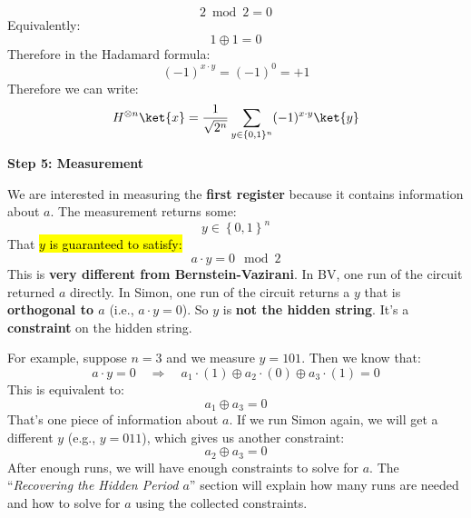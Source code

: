 \begin{remarkbox}[: Explain $H\ket{x} = \frac{1}{\sqrt{2}} \sum_{y\in\{0,1\}} (-1)^{xy}\ket{y}$]
\begin{equation*}
        2\bmod2=0
    \end{equation*}
    Equivalently:
    \begin{equation*}
        1\oplus1=0
    \end{equation*}
    Therefore in the Hadamard formula:
    \begin{equation*}
        (-1)^{x\cdot y}
        =
        (-1)^0
        =
        +1
    \end{equation*}
    Therefore we can write:
    \begin{equation*}
        H^{\otimes n}\ket{x} = \frac{1}{\sqrt{2^n}} \sum_{y \in \{0,1\}^n} (-1)^{x \cdot y} \ket{y}
    \end{equation*}
\end{remarkbox}

\highspace
\begin{flushleft}
    \textcolor{Green3}{ \textbf{Step 5: Measurement}}
\end{flushleft}
We are interested in measuring the \textbf{first register} because it contains information about $a$. The measurement returns some:
\begin{equation*}
    y \in \left\{0,1\right\}^n
\end{equation*}
That \hl{$y$ is guaranteed to satisfy:}
\begin{equation}\label{eq:simons-algorithm-measurement-constraint}
    a \cdot y = 0 \mod 2
\end{equation}
This is \textbf{very different from Bernstein-Vazirani}. In BV, one run of the circuit returned $a$ directly. In Simon, one run of the circuit returns a $y$ that is \textbf{orthogonal to $a$} (i.e., $a \cdot y = 0$). So $y$ is \textbf{not the hidden string}. It's a \textbf{constraint} on the hidden string.

\highspace
For example, suppose $n=3$ and we measure $y=101$. Then we know that:
\begin{equation*}
    a \cdot y = 0 \quad \Rightarrow \quad a_1 \cdot (1) \oplus a_2 \cdot (0) \oplus a_3 \cdot (1) = 0
\end{equation*}
This is equivalent to:
\begin{equation*}
    a_1 \oplus a_3 = 0
\end{equation*}
That's one piece of information about $a$. If we run Simon again, we will get a different $y$ (e.g., $y=011$), which gives us another constraint:
\begin{equation*}
    a_2 \oplus a_3 = 0
\end{equation*}
After enough runs, we will have enough constraints to solve for $a$. The ``\emph{Recovering the Hidden Period $a$}'' section will explain how many runs are needed and how to solve for $a$ using the collected constraints.

